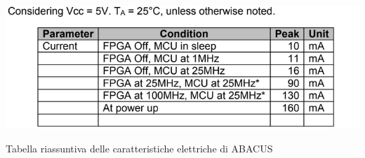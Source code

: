 \documentclass[LaM,binding=0.6cm,oneside]{../sapthesis}
\begin{document}
    \begin{table}[htbp]
    \centerline{\includegraphics[scale=.8]{examples/datasheet/abacusDatasheet6.PNG}}
    \caption{Tabella riassuntiva delle caratteristiche elettriche di ABACUS}
    \label{fig}
    \end{table}




\backmatter

\clearpage

\cleardoublepage
{}

\end{document}
